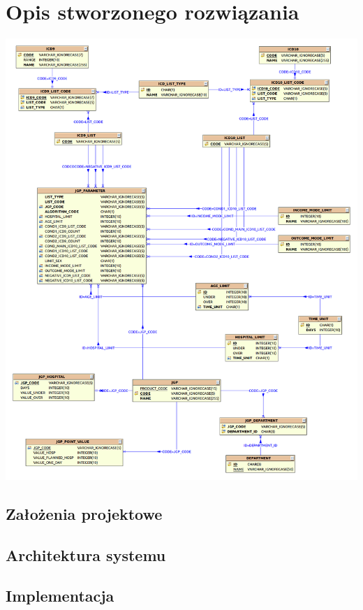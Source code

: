 \chapter{Opis stworzonego rozwiązania}
\label{cha:rozwiazanie}

\includegraphics[scale=0.3]{images/erd}

\section{Założenia projektowe}
\label{sec:zalozeniaProjektowe}

\section{Architektura systemu}
\label{sec:architekturaSystemu}

\section{Implementacja}
\label{sec:architekturaSystemu}


